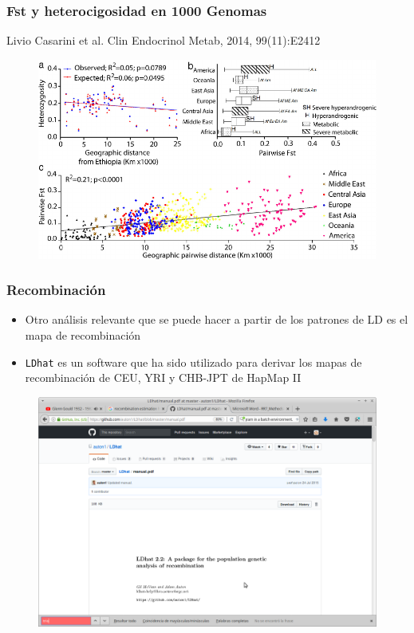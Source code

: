 \documentclass{beamer}\usepackage[]{graphicx}\usepackage[]{color}
\begin{document}
\begin{frame}[fragile]
\frametitle{Fst y heterocigosidad en 1000 Genomas}

Livio Casarini  et al. Clin Endocrinol Metab, 2014, 99(11):E2412

\begin{figure}[htbp]
\begin{center}
\includegraphics[width=1\linewidth]{1000gFst.png}
\end{center}
\end{figure}
\end{frame}



\begin{frame}[fragile]
\frametitle{Recombinaci\'on}

\begin{itemize}
\item Otro an\'alisis relevante que se puede hacer a partir de los patrones de LD es el mapa de recombinaci\'on
\item {\tt LDhat} es un software que ha sido utilizado para derivar los mapas de recombinaci\'on de CEU, YRI y CHB-JPT de HapMap II
\end{itemize}

\begin{figure}[htbp]
\begin{center}
\includegraphics[width=.7\linewidth]{LDHAT.png}
\end{center}
\end{figure}

\end{frame}
\end{document}
